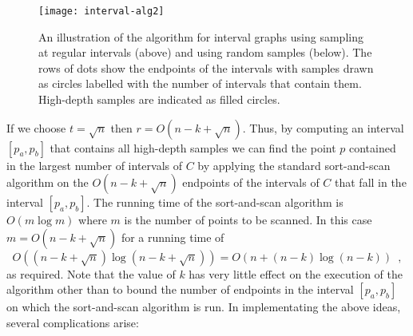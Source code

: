 \documentclass[charterfonts,lotsofwhite]{patmorin}
\begin{document}
\begin{figure}
\begin{center}\texttt{[image: interval-alg2]}\end{center}
\caption{An illustration of the algorithm for interval graphs
using sampling at regular intervals (above) and using random samples
(below).  
The rows of dots show
the endpoints of the intervals with samples drawn as circles labelled with the number
of intervals that contain them.  High-depth samples are indicated as
filled circles.}
\end{figure}

If we choose $t=\sqrt{n}$ then $r=O(n-k+\sqrt{n})$.  Thus, by
computing an interval $[p_a,p_b]$ that contains all high-depth samples
we can find the point $p$ contained in the largest number of
intervals of $C$ by applying the standard sort-and-scan algorithm
on the $O(n-k+\sqrt{n})$ endpoints of the intervals of $C$ that fall
in the interval $[p_a,p_b]$.  The running time of the
sort-and-scan algorithm is $O(m\log m)$ where $m$ is the number of
points to be scanned.  In this case $m=O(n-k+\sqrt{n})$ for a running
time of 
\[
   O((n-k+\sqrt{n})\log(n-k+\sqrt n)) = O(n + (n-k)\log (n-k)) \enspace ,
\]
as required.  Note that the value of $k$ has very little effect on the
execution of the algorithm other than to bound the number of endpoints
in the interval $[p_a,p_b]$ on which the sort-and-scan algorithm is
run.
In implementating the above ideas, several complications arise:
\end{document}
